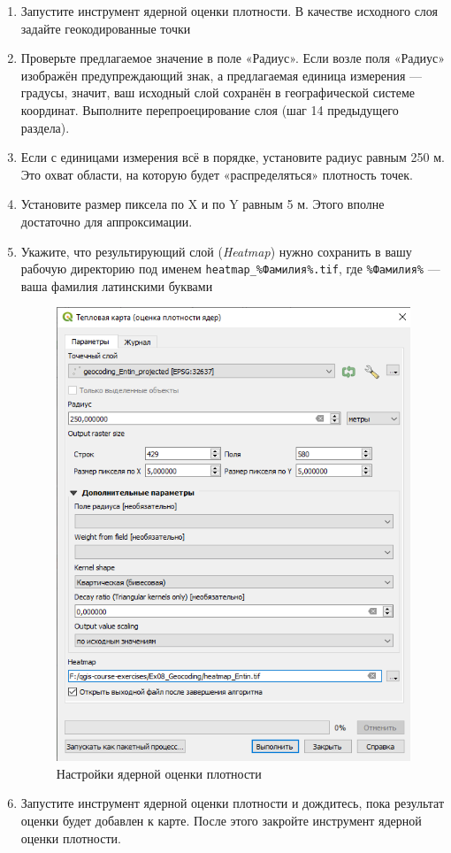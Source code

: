 \documentclass[
  12pt,
]{book}
\begin{document}
\begin{enumerate}
\def\labelenumi{\arabic{enumi}.}
\item
  Запустите инструмент ядерной оценки плотности. В качестве исходного слоя задайте геокодированные точки
\item
  Проверьте предлагаемое значение в поле «Радиус». Если возле поля «Радиус» изображён предупреждающий знак, а предлагаемая единица измерения --- градусы, значит, ваш исходный слой сохранён в географической системе координат. Выполните перепроецирование слоя (шаг 14 предыдущего раздела).
\item
  Если с единицами измерения всё в порядке, установите радиус равным 250 м. Это охват области, на которую будет «распределяться» плотность точек.
\item
  Установите размер пиксела по X и по Y равным 5 м. Этого вполне достаточно для аппроксимации.
\item
  Укажите, что результирующий слой (\emph{Heatmap}) нужно сохранить в вашу рабочую директорию под именем \texttt{heatmap\_\%Фамилия\%.tif}, где \texttt{\%Фамилия\%} --- ваша фамилия латинскими буквами

  \begin{figure}
  \centering
  \includegraphics{images/Ex08_Geocoding/kde01.png}
  \caption{Настройки ядерной оценки плотности}
  \end{figure}
\item
  Запустите инструмент ядерной оценки плотности и дождитесь, пока результат оценки будет добавлен к карте. После этого закройте инструмент ядерной оценки плотности.


\end{enumerate}
\end{document}
